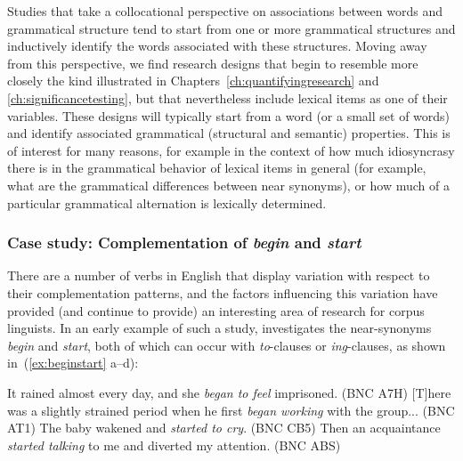 Studies that take a collocational  perspective on associations  between words and grammatical  structure tend to start from one or more grammatical structures and inductively  identify the words associated  with these structures. Moving away from this perspective, we find research designs  that begin to resemble more closely the kind illustrated in Chapters~\ref{ch:quantifyingresearch} and \ref{ch:significancetesting}, but that nevertheless include lexical items as one of their variables. These designs will typically start from a word (or a small set of words) and identify associated  grammatical  (structural and semantic)  properties. This is of interest for many reasons, for example in the context of how much idiosyncrasy there is in the grammatical behavior of lexical items in general (for example, what are the grammatical differences between near synonyms),  or how much of a particular grammatical alternation  is lexically determined.

\subsubsection{Case study: Complementation of \textit{begin} and \textit{start}}
\label{sec:complementationofbeginandstart}

There are a number of verbs  in English that display variation  with respect to their complementation  patterns, and the factors influencing this variation have provided (and continue to provide) an interesting area of research for corpus linguists. In an early example of such a study, \citet{schmid_introspection_1996} investigates the near\hyp{}synonyms  \textit{begin} and \textit{start}, both of which can occur with \textit{to}-clauses or \textit{ing}-clauses, as shown in (\ref{ex:beginstart} a--d):

\begin{exe}
\ex
\begin{xlist}
\label{ex:beginstart}
\ex It rained almost every day, and she \textit{began to feel} imprisoned. (BNC A7H)
\ex $[$T$]$here was a slightly strained period when he first \textit{began working} with the group... (BNC AT1)
\ex The baby wakened and \textit{started to cry}. (BNC CB5)
\ex Then an acquaintance \textit{started talking} to me and diverted my attention. (BNC ABS)
\end{xlist}
\end{exe}

